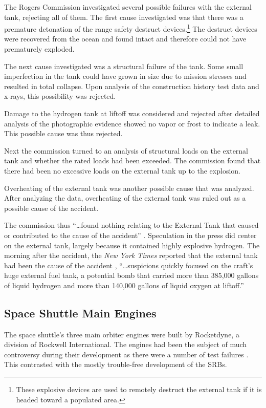 The Rogers Commission investigated several possible failures with the external tank, rejecting all of them. The first cause investigated was that there was a premature detonation of the range safety destruct devices.\footnote{These explosive devices are used to remotely destruct the external tank if it is headed toward a populated area.} The destruct devices were recovered from the ocean and found intact and therefore could not have prematurely exploded.

The next cause investigated was a structural failure of the tank. Some small imperfection in the tank could have grown in size due to mission stresses and resulted in total collapse. Upon analysis of the construction history test data and x-rays, this possibility was rejected.

Damage to the hydrogen tank at liftoff was considered and rejected after detailed analysis of the photographic evidence showed no vapor or frost to indicate a leak. This possible cause was thus rejected.

Next the commission turned to an analysis of structural loads on the external tank and whether the rated loads had been exceeded. The commission found that there had been no excessive loads on the external tank up to the explosion.

Overheating of the external tank was another possible cause that was analyzed. After analyzing the data, overheating of the external tank was ruled out as a possible cause of the accident.

The commission thus ``\ldots found nothing relating to the External Tank that caused or contributed to the cause of the accident'' \cite[vol. 1, p. 42]{rogers}. Speculation in the press did center on the external tank, largely because it contained highly explosive hydrogen. The morning after the accident, the {\em New York Times} reported that the external tank had been the cause of the accident \cite[p. A1]{nytexternal}, ``\ldots suspicions quickly focused on the craft's huge external fuel tank, a potential bomb that carried more than 385,000 gallons of liquid hydrogen and more than 140,000 gallons of liquid oxygen at liftoff.''

\subsection{Space Shuttle Main Engines}

The space shuttle's three main orbiter engines were built by Rocketdyne, a division of Rockwell International. The engines had been the subject of much controversy during their development as there were a number of test failures \cite{lewis}. This contrasted with the mostly trouble-free development of the SRBs.

